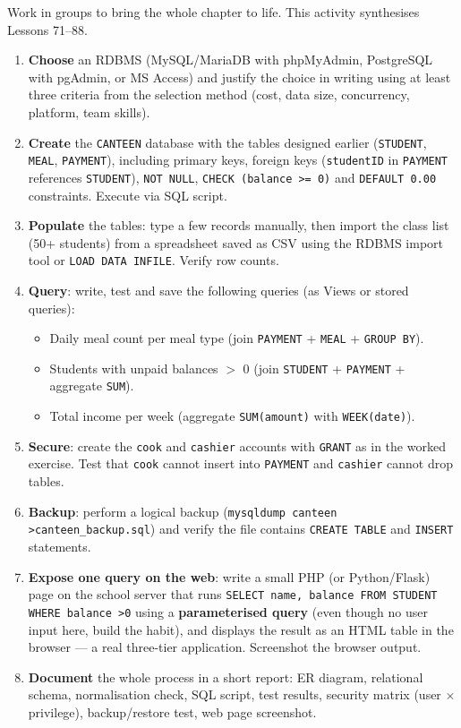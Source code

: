 \documentclass[11pt]{article}
\begin{document}
\begin{experience}
Work in groups to bring the whole chapter to life. This activity synthesises Lessons 71–88.
\begin{enumerate}
\item \textbf{Choose} an RDBMS (MySQL/MariaDB with phpMyAdmin, PostgreSQL with pgAdmin, or MS Access) and justify the choice in writing using at least three criteria from the selection method (cost, data size, concurrency, platform, team skills).
\item \textbf{Create} the \texttt{CANTEEN} database with the tables designed earlier (\texttt{STUDENT}, \texttt{MEAL}, \texttt{PAYMENT}), including primary keys, foreign keys (\texttt{studentID} in \texttt{PAYMENT} references \texttt{STUDENT}), \texttt{NOT NULL}, \texttt{CHECK (balance \textgreater= 0)} and \texttt{DEFAULT 0.00} constraints. Execute via SQL script.
\item \textbf{Populate} the tables: type a few records manually, then import the class list (50+ students) from a spreadsheet saved as CSV using the RDBMS import tool or \texttt{LOAD DATA INFILE}. Verify row counts.
\item \textbf{Query}: write, test and save the following queries (as Views or stored queries):
\begin{itemize}
\item Daily meal count per meal type (join \texttt{PAYMENT} + \texttt{MEAL} + \texttt{GROUP BY}).
\item Students with unpaid balances $>$ 0 (join \texttt{STUDENT} + \texttt{PAYMENT} + aggregate \texttt{SUM}).
\item Total income per week (aggregate \texttt{SUM(amount)} with \texttt{WEEK(date)}).
\end{itemize}
\item \textbf{Secure}: create the \texttt{cook} and \texttt{cashier} accounts with \texttt{GRANT} as in the worked exercise. Test that \texttt{cook} cannot insert into \texttt{PAYMENT} and \texttt{cashier} cannot drop tables.
\item \textbf{Backup}: perform a logical backup (\texttt{mysqldump canteen \textgreater canteen\_backup.sql}) and verify the file contains \texttt{CREATE TABLE} and \texttt{INSERT} statements.
\item \textbf{Expose one query on the web}: write a small PHP (or Python/Flask) page on the school server that runs \texttt{SELECT name, balance FROM STUDENT WHERE balance \textgreater 0} using a \textbf{parameterised query} (even though no user input here, build the habit), and displays the result as an HTML table in the browser — a real three-tier application. Screenshot the browser output.
\item \textbf{Document} the whole process in a short report: ER diagram, relational schema, normalisation check, SQL script, test results, security matrix (user $\times$ privilege), backup/restore test, web page screenshot.
\end{enumerate}
\end{experience}
\end{document}
